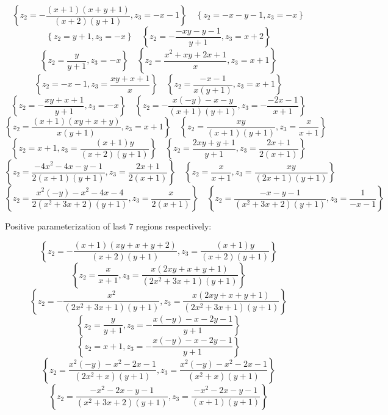 \documentclass[12pt]{article}
\theoremstyle{definition}
\theoremstyle{plain}
\begin{document}
\[\left\{z_2 = -\frac{(x+1) (x+y+1)}{(x+2) (y+1)},z_3 = -x-1\right\}
\quad \left\{z_2 = -x-y-1,z_3 = -x\right\}\]
\[\left\{z_2 = y+1,z_3 = -x\right\}
\quad \left\{z_2 = -\frac{-x y-y-1}{y+1},z_3 = x+2\right\}\]
\[\left\{z_2 = \frac{y}{y+1},z_3 = -x\right\}
\quad \left\{z_2 = \frac{x^2+x y+2 x+1}{x},z_3 = x+1\right\}\]
\[\left\{z_2 = -x-1,z_3 = \frac{x y+x+1}{x}\right\}
\quad \left\{z_2 = \frac{-x-1}{x (y+1)},z_3 = x+1\right\}\]
\[\left\{z_2 = -\frac{x y+x+1}{y+1},z_3 = -x\right\}
\quad \left\{z_2 = -\frac{x (-y)-x-y}{(x+1) (y+1)},z_3 = -\frac{-2 x-1}{x+1}\right\}\]
\[\left\{z_2 = \frac{(x+1) (x y+x+y)}{x (y+1)},z_3 = x+1\right\}
\quad \left\{z_2 = \frac{x y}{(x+1) (y+1)},z_3 = \frac{x}{x+1}\right\}\]
\[\left\{z_2 = x+1,z_3 = \frac{(x+1) y}{(x+2) (y+1)}\right\}
\quad \left\{z_2 = \frac{2 x y+y+1}{y+1},z_3 = \frac{2 x+1}{2 (x+1)}\right\}\]
\[\left\{z_2 = \frac{-4 x^2-4 x-y-1}{2 (x+1) (y+1)},z_3 = \frac{2 x+1}{2 (x+1)}\right\}
\quad \left\{z_2 = \frac{x}{x+1},z_3 = \frac{x y}{(2 x+1) (y+1)}\right\}\]
\[\left\{z_2 = \frac{x^2 (-y)-x^2-4 x-4}{2 \left(x^2+3 x+2\right) (y+1)},z_3 = \frac{x}{2 (x+1)}\right\}
\quad \left\{z_2 = \frac{-x-y-1}{\left(x^2+3 x+2\right) (y+1)},z_3 = \frac{1}{-x-1}\right\}\]

Positive parameterization of last $7$ regions respectively:

\[\left\{z_2 = -\frac{(x+1) (x y+x+y+2)}{(x+2) (y+1)},z_3 = \frac{(x+1) y}{(x+2) (y+1)}\right\}\]
\[\left\{z_2 = \frac{x}{x+1},z_3 = \frac{x (2 x y+x+y+1)}{\left(2 x^2+3 x+1\right) (y+1)}\right\}\]
\[\left\{z_2 = -\frac{x^2}{\left(2 x^2+3 x+1\right) (y+1)},z_3 = \frac{x (2 x y+x+y+1)}{\left(2 x^2+3 x+1\right) (y+1)}\right\}\]
\[\left\{z_2 = \frac{y}{y+1},z_3 = -\frac{x (-y)-x-2 y-1}{y+1}\right\}\]
\[\left\{z_2 = x+1,z_3 = -\frac{x (-y)-x-2 y-1}{y+1}\right\}\]
\[\left\{z_2 = \frac{x^2 (-y)-x^2-2 x-1}{\left(2 x^2+x\right) (y+1)},z_3 = \frac{x^2 (-y)-x^2-2 x-1}{\left(x^2+x\right) (y+1)}\right\}\]
\[\left\{z_2 = \frac{-x^2-2 x-y-1}{\left(x^2+3 x+2\right) (y+1)},z_3 = \frac{-x^2-2 x-y-1}{(x+1) (y+1)}\right\}\]
\end{document}
